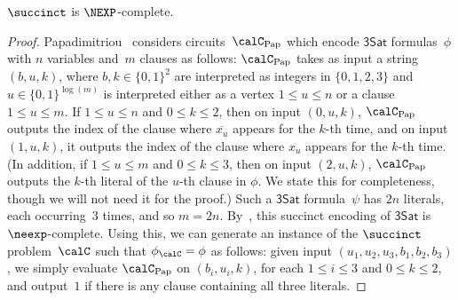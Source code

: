 \begin{proposition}
$\succinct$ is $\NEXP$-complete.
\end{proposition}
\begin{proof}
Papadimitriou~\cite{Pap94}
considers circuits~$\calC_{\mathrm{Pap}}$ which encode $\mathsf{3Sat}$ formulas~$\phi$ with $n$ variables and~$m$ clauses
as follows:
$\calC_{\mathrm{Pap}}$ takes as input a string $(b, u, k)$, where $b, k \in \{0, 1\}^2$ are interpreted as integers in $\{0, 1, 2, 3\}$
and $u \in \{0, 1\}^{\log(m)}$ is interpreted either as a vertex $1 \leq u \leq n$ or a clause $1 \leq u \leq m$.
If $1 \leq u \leq n$ and $0 \leq k \leq 2$, 
then on input $(0, u, k)$, $\calC_{\mathrm{Pap}}$ outputs the index of the clause where $\overline{x_u}$ appears for the $k$-th time,
and on input $(1, u, k)$,  it outputs the index of the clause where $x_u$ appears for the $k$-th time.
(In addition, if $1 \leq u \leq m$ and $0 \leq k \leq 3$, then on input $(2, u, k)$,
$\calC_{\mathrm{Pap}}$ outputs the $k$-th literal of the $u$-th clause in $\phi$.
We state this for completeness, though we will not need it for the proof.)
Such a $\mathsf{3Sat}$ formula~$\psi$ has $2n$ literals, each occurring~$3$ times, and so $m = 2n$.
By~\cite[Chapter 20]{Pap94}, this succinct encoding of $\mathsf{3Sat}$ is $\neexp$-complete.
Using this, we can generate an instance of the $\succinct$ problem~$\calC$ such that $\phi_\calC = \phi$ as follows:
given input $(u_1, u_2, u_3, b_1, b_2, b_3)$, we simply evaluate $\calC_{\mathrm{Pap}}$ on $(b_i, u_i, k)$, for each $1 \leq i \leq 3$ and $0 \leq k \leq 2$, and output~$1$ if there is any clause containing all three literals.
\end{proof}

